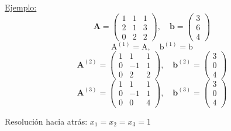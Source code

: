 \documentclass{article}
\begin{document}
\underline{Ejemplo:}
$$\textbf{A}=\begin{pmatrix}
1 & 1 & 1 \\
2 & 1 & 3 \\
0 & 2 & 2
\end{pmatrix},\quad\textbf{b}=\left(\begin{array}{c}
3 \\
6 \\
4
\end{array}\right)$$
$$\text{A}^{(1)}=\text{A},\quad\text{b}^{(1)}=\text{b}$$
$$\textbf{A}^{(2)}=\begin{pmatrix}
1 & 1 & 1 \\
0 & -1 & 1 \\
0 & 2 & 2
\end{pmatrix},\quad\textbf{b}^{(2)}=\left(\begin{array}{c}
3 \\
0 \\
4
\end{array}\right)$$
$$\textbf{A}^{(3)}=\begin{pmatrix}
1 & 1 & 1 \\
0 & -1 & 1 \\
0 & 0 & 4
\end{pmatrix},\quad\textbf{b}^{(3)}=\left(\begin{array}{c}
3 \\
0 \\
4
\end{array}\right)$$
\begin{center}Resolución hacia atrás: $x_1=x_2=x_3=1$\end{center}
\end{document}
